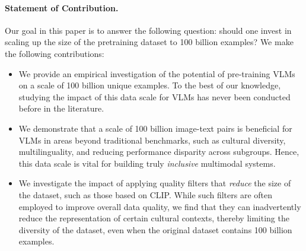 \paragraph{Statement of Contribution.}Our goal in this paper is to answer the following question: should one invest in scaling up the size of the pretraining dataset to 100 billion examples? We make the following contributions:
\begin{itemize}
    \item We provide an empirical investigation of the potential of pre-training VLMs on a scale of 100 billion unique examples. To the best of our knowledge, studying the impact of this data scale for VLMs has never been conducted before in the literature.  
    \item We demonstrate that a  scale of 100 billion image-text pairs is beneficial for VLMs in areas beyond traditional benchmarks, such as cultural diversity, multilinguality, and reducing performance disparity across subgroups. Hence, this data scale is vital for building truly \emph{inclusive} multimodal systems.
    \item We investigate the impact of applying quality filters that \emph{reduce} the size of the dataset, such as those based on CLIP. While such filters are often employed to improve overall data quality, we find that they can inadvertently reduce the representation of certain cultural contexts, thereby limiting the diversity of the dataset, even when the original dataset contains 100 billion examples.
\end{itemize}
